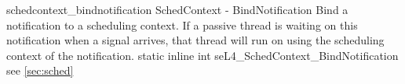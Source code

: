 %
%
%
%

\apidoc
{schedcontext_bindnotification}
{SchedContext - BindNotification}
{Bind a notification to a scheduling context. If a passive thread is waiting on this notification when a signal arrives, that thread will run on using the scheduling context of the notification.}
{static inline int seL4\_SchedContext\_BindNotification}
{
}
{\errorenumdesc}
{see \autoref{sec:sched}}

